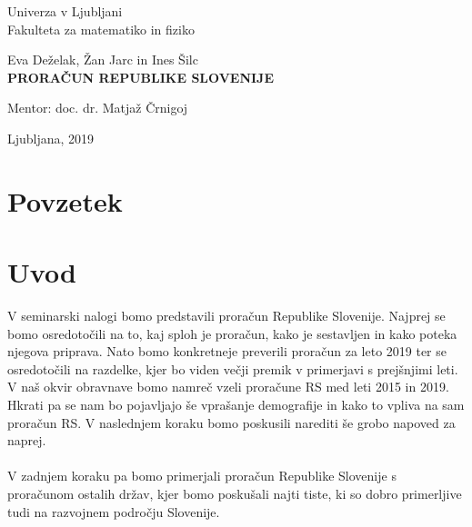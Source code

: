 \documentclass[12pt, a4paper]{article}
\begin{document}
\begin{titlepage}
\begin{center}

\large
Univerza v Ljubljani\\
\normalsize
Fakulteta za matematiko in fiziko\\

\vspace{3 cm} 

\large
Eva Deželak, Žan Jarc in Ines Šilc\\

\vspace{0.5cm}
\LARGE
\textbf{PRORAČUN REPUBLIKE SLOVENIJE}

\vspace{0.5 cm}
\normalsize


\vspace{1.5cm}
\normalsize
Mentor: doc. dr. Matjaž Črnigoj

\vspace{3cm}


\vfill

\large Ljubljana, 2019

\end{center}
\end{titlepage}



\newpage
\section*{Povzetek}


\newpage

\tableofcontents
\vspace{20mm}

\newpage
\section[Uvod]{Uvod}
V seminarski nalogi bomo predstavili proračun Republike Slovenije. Najprej se bomo osredotočili na to, kaj sploh je proračun, kako je sestavljen in kako poteka njegova priprava. Nato bomo konkretneje preverili proračun za leto 2019 ter se osredotočili na razdelke, kjer bo viden večji premik v primerjavi s prejšnjimi leti. V naš okvir obravnave bomo namreč vzeli proračune RS med leti 2015 in 2019. Hkrati pa se nam bo pojavljajo še vprašanje demografije in kako to vpliva na sam proračun RS. V naslednjem koraku bomo poskusili narediti še grobo napoved za naprej. \\
\\
V zadnjem koraku pa  bomo primerjali proračun Republike Slovenije s proračunom ostalih držav, kjer bomo poskušali najti tiste, ki so dobro primerljive tudi na razvojnem področju Slovenije. 
\\
\\
\end{document}
